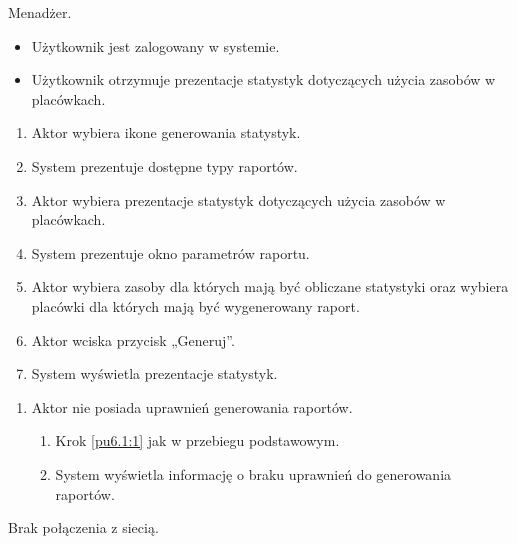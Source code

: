 Menadżer.

\begin{itemize}
\item Użytkownik jest zalogowany w systemie.
\end{itemize}

\begin{itemize}
\item Użytkownik otrzymuje prezentacje statystyk dotyczących użycia zasobów w placówkach.
\end{itemize}

\begin{enumerate}
	\item \label{pu7.3.2:1} Aktor wybiera ikone generowania statystyk.
	\item System prezentuje dostępne typy raportów.
	\item \label{pu7.3.2:2} Aktor wybiera prezentacje statystyk dotyczących użycia zasobów w placówkach.
	\item System prezentuje okno parametrów raportu.
	\item Aktor wybiera zasoby dla których mają być obliczane statystyki oraz wybiera placówki dla których mają być wygenerowany raport.
	\item Aktor wciska przycisk „Generuj”.
	\item System wyświetla prezentacje statystyk.
\end{enumerate}

\begin{enumerate}
	\item Aktor nie posiada uprawnień generowania raportów.
	\begin{enumerate}[label*=\arabic*.]
		\item Krok \ref{pu6.1:1} jak w przebiegu podstawowym.
		\item System wyświetla informację o braku uprawnień do generowania raportów.
	\end{enumerate}
\end{enumerate}

Brak połączenia z siecią.

